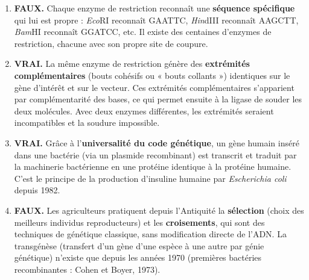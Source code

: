 \documentclass[11pt]{article}
\newcommand{\cle}[1]{{\popxbold\color{popdark}#1}}
\begin{document}
\begin{corrige}
\begin{enumerate}
\item \textbf{FAUX.} Chaque enzyme de restriction reconnaît une \textbf{séquence spécifique} qui lui est propre : \emph{Eco}RI reconnaît GAATTC, \emph{Hin}dIII reconnaît AAGCTT, \emph{Bam}HI reconnaît GGATCC, etc. Il existe des centaines d'enzymes de restriction, chacune avec son propre site de coupure.
\item \textbf{VRAI.} La même enzyme de restriction génère des \textbf{extrémités complémentaires} (bouts cohésifs ou « bouts collants ») identiques sur le gène d'intérêt et sur le vecteur. Ces extrémités complémentaires s'apparient par complémentarité des bases, ce qui permet ensuite à la ligase de souder les deux molécules. Avec deux enzymes différentes, les extrémités seraient incompatibles et la soudure impossible.
\item \textbf{VRAI.} Grâce à l'\textbf{universalité du code génétique}, un gène humain inséré dans une bactérie (via un plasmide recombinant) est transcrit et traduit par la machinerie bactérienne en une protéine identique à la protéine humaine. C'est le principe de la production d'insuline humaine par \emph{Escherichia coli} depuis 1982.
\item \textbf{FAUX.} Les agriculteurs pratiquent depuis l'Antiquité la \textbf{sélection} (choix des meilleurs individus reproducteurs) et les \textbf{croisements}, qui sont des techniques de génétique classique, sans modification directe de l'ADN. La \cle{transgénèse} (transfert d'un gène d'une espèce à une autre par génie génétique) n'existe que depuis les années 1970 (premières bactéries recombinantes : Cohen et Boyer, 1973).
\end{enumerate}
\end{corrige}
\end{document}
